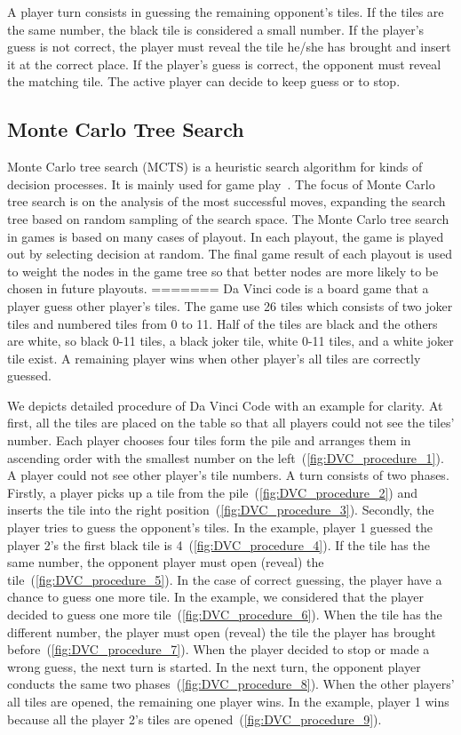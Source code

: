 \documentclass[conference]{IEEEtran}
\begin{document}
A player turn consists in guessing the remaining opponent's tiles. 
If the tiles are the same number, the black tile is considered a small number.
If the player's guess is not correct, the player must reveal the tile he/she has brought and insert it at the correct place.
If the player's guess is correct, the opponent must reveal the matching tile.
The active player can decide to keep guess or to stop.

\subsection{Monte Carlo Tree Search}

Monte Carlo tree search (MCTS) is a heuristic search algorithm for kinds of decision processes.
It is mainly used for game play~\cite{MCTS}.  
The focus of Monte Carlo tree search is on the analysis of the most successful moves, expanding the search tree based on random sampling of the search space. 
The Monte Carlo tree search in games is based on many cases of playout. 
In each playout, the game is played out by selecting decision at random. 
The final game result of each playout is used to weight the nodes in the game tree so that better nodes are more likely to be chosen in future playouts.
=======
Da Vinci code is a board game that a player guess other player's tiles.
The game use 26 tiles which consists of two joker tiles and numbered tiles from 0 to 11. 
Half of the tiles are black and the others are white, so black 0-11 tiles, a black joker tile, white 0-11 tiles, and a white joker tile exist.
A remaining player wins when other player's all tiles are correctly guessed.

We depicts detailed procedure of Da Vinci Code with an example for clarity.
At first, all the tiles are placed on the table so that all players could not see the tiles' number.
Each player chooses four tiles form the pile and arranges them in ascending order with the smallest number on the left~(\cref{fig:DVC_procedure_1}).
A player could not see other player's tile numbers.
A turn consists of two phases.
Firstly, a player picks up a tile from the pile~(\cref{fig:DVC_procedure_2}) and inserts the tile into the right position~(\cref{fig:DVC_procedure_3}).
Secondly, the player tries to guess the opponent's tiles.
In the example, player 1 guessed the player 2's the first black tile is 4~(\cref{fig:DVC_procedure_4}).
If the tile has the same number, the opponent player must open (reveal) the tile~(\cref{fig:DVC_procedure_5}).
In the case of correct guessing, the player have a chance to guess one more tile.
In the example, we considered that the player decided to guess one more tile~(\cref{fig:DVC_procedure_6}).
When the tile has the different number, the player must open (reveal) the tile the player has brought before~(\cref{fig:DVC_procedure_7}).
When the player decided to stop or made a wrong guess, the next turn is started.
In the next turn, the opponent player conducts the same two phases~(\cref{fig:DVC_procedure_8}).
When the other players' all tiles are opened, the remaining one player wins.
In the example, player 1 wins because all the player 2's tiles are opened~(\cref{fig:DVC_procedure_9}).
\end{document}
